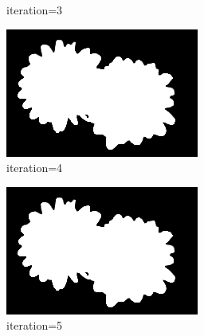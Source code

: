 \documentclass{article}
\begin{document}
\begin{figure}[t]
\begin{subfigure}[t]{0.19\textwidth}
\vspace{-0.6cm}
\caption{iteration=3}
\end{subfigure}
\begin{subfigure}[t]{0.19\textwidth}
\centering
\includegraphics[width=\textwidth]{./images/marginals_iter_4.png}
\vspace{-0.6cm}
\caption{iteration=4}
\end{subfigure}
\begin{subfigure}[t]{0.19\textwidth}
\centering
\includegraphics[width=\textwidth]{./images/marginals_iter_5.png}
\vspace{-0.6cm}
\caption{iteration=5}
\end{subfigure}
\begin{subfigure}[t]{0.19\textwidth}
\centering

\end{subfigure}
\end{figure}
\end{document}
